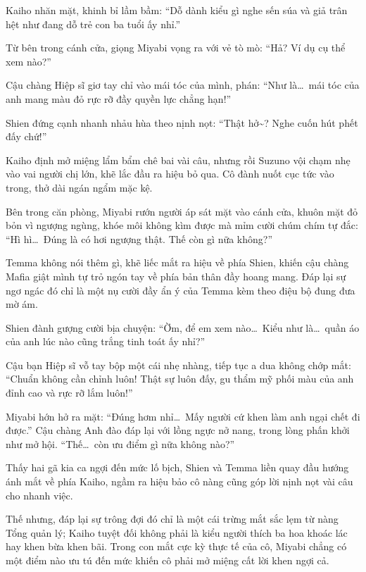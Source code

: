 \documentclass[../main.tex]{subfiles}
\begin{document}
Kaiho nhăn mặt, khinh bỉ lầm bầm: ``Dỗ dành kiểu gì nghe sến súa và giả trân hệt như đang dỗ trẻ con ba tuổi ấy nhỉ.''

Từ bên trong cánh cửa, giọng Miyabi vọng ra với vẻ tò mò: ``Hả? Ví dụ cụ thể xem nào?''

Cậu chàng Hiệp sĩ giơ tay chỉ vào mái tóc của mình, phán: ``Như là\dots\ mái tóc của anh mang màu đỏ rực rỡ đầy quyền lực chẳng hạn!''

Shien đứng cạnh nhanh nhảu hùa theo nịnh nọt: ``Thật hở\~{}? Nghe cuốn hút phết đấy chứ!''

Kaiho định mở miệng lẩm bẩm chê bai vài câu, nhưng rồi Suzuno vội chạm nhẹ vào vai người chị lớn, khẽ lắc đầu ra hiệu bỏ qua. Cô đành nuốt cục tức vào trong, thở dài ngán ngẩm mặc kệ.

Bên trong căn phòng, Miyabi rướn người áp sát mặt vào cánh cửa, khuôn mặt đỏ bỏn vì ngượng ngùng, khóe môi không kìm được mà mỉm cười chúm chím tự đắc: ``Hì hì\dots\ Đúng là có hơi ngượng thật. Thế còn gì nữa không?''


Temma không nói thêm gì, khẽ liếc mắt ra hiệu về phía Shien, khiến cậu chàng Mafia giật mình tự trỏ ngón tay về phía bản thân đầy hoang mang. Đáp lại sự ngơ ngác đó chỉ là một nụ cười đầy ẩn ý của Temma kèm theo điệu bộ đung đưa mờ ám.

Shien đành gượng cười bịa chuyện: ``Ờm, để em xem nào\dots\ Kiểu như là\dots\ quần áo của anh lúc nào cũng trắng tinh toát ấy nhỉ?''

Cậu bạn Hiệp sĩ vỗ tay bộp một cái nhẹ nhàng, tiếp tục a dua không chớp mắt: ``Chuẩn không cần chỉnh luôn! Thật sự luôn đấy, gu thẩm mỹ phối màu của anh đỉnh cao và rực rỡ lắm luôn!''

Miyabi hớn hở ra mặt: ``Đúng hơm nhỉ\dots\ Mấy người cứ khen làm anh ngại chết đi được.'' Cậu chàng Anh đào đáp lại với lồng ngực nở nang, trong lòng phấn khởi như mở hội. ``Thế\dots\ còn ưu điểm gì nữa không nào?''


Thấy hai gã kia ca ngợi đến mức lố bịch, Shien và Temma liền quay đầu hướng ánh mắt về phía Kaiho, ngầm ra hiệu bảo cô nàng cũng góp lời nịnh nọt vài câu cho nhanh việc.

Thế nhưng, đáp lại sự trông đợi đó chỉ là một cái trừng mắt sắc lẹm từ nàng Tổng quản lý; Kaiho tuyệt đối không phải là kiểu người thích ba hoa khoác lác hay khen bừa khen bãi. Trong con mắt cực kỳ thực tế của cô, Miyabi chẳng có một điểm nào ưu tú đến mức khiến cô phải mở miệng cất lời khen ngợi cả.
\end{document}
